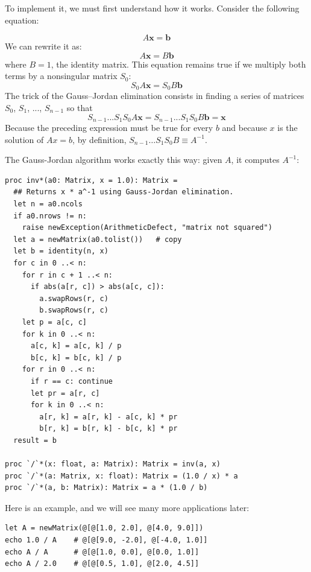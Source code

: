 \documentclass[justified, sixbynine]{tufte-book}
\def\ft{\small\tt}
\theoremstyle{plain}%
\newtheorem * {corollary}{Corollary}
\theoremstyle{definition}
\theoremstyle{remark}
\newtheorem * {remark}{Remark}
\newtheorem * {note}{Note}
\begin{document}
\begin{fullwidth}
To implement it, we must first understand how it works. Consider the following equation:

\begin{equation}
A \mathbf{x} = \mathbf{b}
\end{equation}
We can rewrite it as:
\begin{equation}
A \mathbf{x} = B \mathbf{b}
\end{equation}
where $B=1$, the identity matrix. This equation remains true if we multiply both terms by a nonsingular matrix $S_0$:
\begin{equation}
S_0 A \mathbf{x} = S_0 B \mathbf{b}
\end{equation}
The trick of the Gauss--Jordan elimination consists in finding a series of matrices $S_0$, $S_1$, ..., $S_{n-1}$ so that
\begin{equation}
S_{n-1} ... S_1 S_0 A \mathbf{x} = S_{n-1} ... S_1 S_0 B \mathbf{b} = \mathbf{x}
\end{equation}
Because the preceding expression must be true for every $b$ and because $x$ is the solution of $A x=b$, by definition, 
$S_{n-1} \ldots S_1 S_0 B \equiv A^{-1}$.

The Gauss-Jordan algorithm works exactly this way: given $A$, it computes $A^{-1}$:

\begin{lstlisting}[caption={in file: {\ft nlib/matrix.nim}}]
proc inv*(a0: Matrix, x = 1.0): Matrix =
  ## Returns x * a^-1 using Gauss-Jordan elimination.
  let n = a0.ncols
  if a0.nrows != n:
    raise newException(ArithmeticDefect, "matrix not squared")
  let a = newMatrix(a0.tolist())   # copy
  let b = identity(n, x)
  for c in 0 ..< n:
    for r in c + 1 ..< n:
      if abs(a[r, c]) > abs(a[c, c]):
        a.swapRows(r, c)
        b.swapRows(r, c)
    let p = a[c, c]
    for k in 0 ..< n:
      a[c, k] = a[c, k] / p
      b[c, k] = b[c, k] / p
    for r in 0 ..< n:
      if r == c: continue
      let pr = a[r, c]
      for k in 0 ..< n:
        a[r, k] = a[r, k] - a[c, k] * pr
        b[r, k] = b[r, k] - b[c, k] * pr
  result = b

proc `/`*(x: float, a: Matrix): Matrix = inv(a, x)
proc `/`*(a: Matrix, x: float): Matrix = (1.0 / x) * a
proc `/`*(a, b: Matrix): Matrix = a * (1.0 / b)
\end{lstlisting}

Here is an example, and we will see many more applications later:

\begin{lstlisting}
let A = newMatrix(@[@[1.0, 2.0], @[4.0, 9.0]])
echo 1.0 / A    # @[@[9.0, -2.0], @[-4.0, 1.0]]
echo A / A      # @[@[1.0, 0.0], @[0.0, 1.0]]
echo A / 2.0    # @[@[0.5, 1.0], @[2.0, 4.5]]
\end{lstlisting}


\end{fullwidth}
\end{document}
